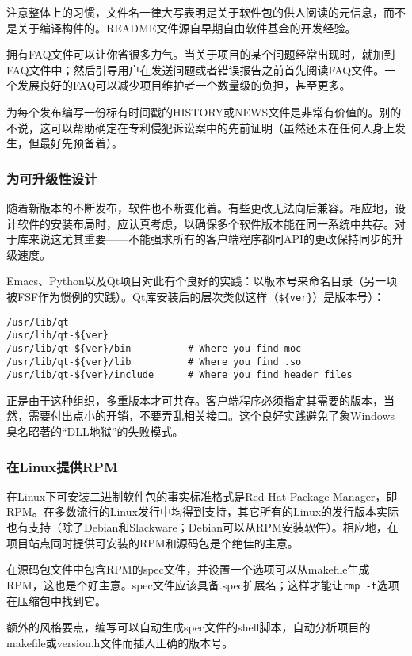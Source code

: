 \documentclass[12pt,oneside]{ctexbook}
\begin{document}
\begin{common-format}
注意整体上的习惯，文件名一律大写表明是关于软件包的供人阅读的元信息，而不是关于编译构件的。README文件源自早期自由软件基金的开发经验。

拥有FAQ文件可以让你省很多力气。当关于项目的某个问题经常出现时，就加到FAQ文件中；然后引导用户在发送问题或者错误报告之前首先阅读FAQ文件。一个发展良好的FAQ可以减少项目维护者一个数量级的负担，甚至更多。

为每个发布编写一份标有时间戳的HISTORY或NEWS文件是非常有价值的。别的不说，这可以帮助确定在专利侵犯诉讼案中的先前证明（虽然还未在任何人身上发生，但最好先预备着）。

\subsubsection{为可升级性设计}
随着新版本的不断发布，软件也不断变化着。有些更改无法向后兼容。相应地，设计软件的安装布局时，应认真考虑，以确保多个软件版本能在同一系统中共存。对于库来说这尤其重要——不能强求所有的客户端程序都同API的更改保持同步的升级速度。

Emacs、Python以及Qt项目对此有个良好的实践：以版本号来命名目录（另一项被FSF作为惯例的实践）。Qt库安装后的层次类似这样（\verb+${ver}+）是版本号）：
\begin{Verbatim}
/usr/lib/qt
/usr/lib/qt-${ver}
/usr/lib/qt-${ver}/bin          # Where you find moc
/usr/lib/qt-${ver}/lib          # Where you find .so
/usr/lib/qt-${ver}/include      # Where you find header files
\end{Verbatim}

正是由于这种组织，多重版本才可共存。客户端程序必须指定其需要的版本，当然，需要付出点小的开销，不要弄乱相关接口。这个良好实践避免了象Windows臭名昭著的“DLL地狱”的失败模式。


\subsubsection{在Linux提供RPM}
在Linux下可安装二进制软件包的事实标准格式是Red Hat Package Manager，即RPM。在多数流行的Linux发行中均得到支持，其它所有的Linux的发行版本实际也有支持（除了Debian和Slackware；Debian可以从RPM安装软件）。相应地，在项目站点同时提供可安装的RPM和源码包是个绝佳的主意。

在源码包文件中包含RPM的spec文件，并设置一个选项可以从makefile生成RPM，这也是个好主意。spec文件应该具备.spec扩展名；这样才能让\verb+rmp -t+选项在压缩包中找到它。

额外的风格要点，编写可以自动生成spec文件的shell脚本，自动分析项目的makefile或version.h文件而插入正确的版本号。


\end{common-format}
\end{document}
